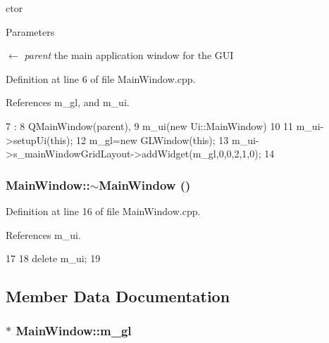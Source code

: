 ctor 


\begin{DoxyParams}{Parameters}
\item[\mbox{$\leftarrow$} {\em parent}]the main application window for the GUI \end{DoxyParams}


Definition at line 6 of file MainWindow.cpp.



References m\_\-gl, and m\_\-ui.




\begin{DoxyCode}
7                                       :
8     QMainWindow(parent),
9     m_ui(new Ui::MainWindow)
10 {
11     m_ui->setupUi(this);
12     m_gl=new GLWindow(this);
13     m_ui->s_mainWindowGridLayout->addWidget(m_gl,0,0,2,1,0);
14 
}
\end{DoxyCode}


\hypertarget{class_main_window_ae98d00a93bc118200eeef9f9bba1dba7}{
\subsubsection[{$\sim$MainWindow}]{\setlength{\rightskip}{0pt plus 5cm}MainWindow::$\sim$MainWindow ()}}
\label{class_main_window_ae98d00a93bc118200eeef9f9bba1dba7}


Definition at line 16 of file MainWindow.cpp.



References m\_\-ui.




\begin{DoxyCode}
17 {
18     delete m_ui;
19 }
\end{DoxyCode}




\subsection{Member Data Documentation}
\hypertarget{class_main_window_a8f18111d1b422167f8b9a688f38f8969}{
\subsubsection[{m\_\-gl}]{$\ast$ {\bf MainWindow::m\_\-gl}}}
\label{class_main_window_a8f18111d1b422167f8b9a688f38f8969}


